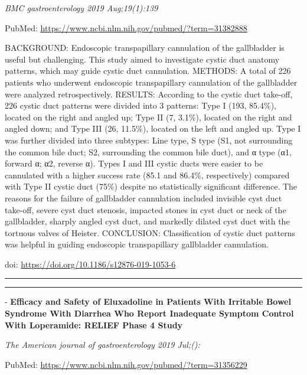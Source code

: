 \documentclass[]{article}
\begin{document}
\emph{BMC gastroenterology 2019 Aug;19(1):139}

PubMed: \url{https://www.ncbi.nlm.nih.gov/pubmed/?term=31382888}

BACKGROUND: Endoscopic transpapillary cannulation of the gallbladder is
useful but challenging. This study aimed to investigate cystic duct
anatomy patterns, which may guide cystic duct cannulation. METHODS: A
total of 226 patients who underwent endoscopic transpapillary
cannulation of the gallbladder were analyzed retrospectively. RESULTS:
According to the cystic duct take-off, 226 cystic duct patterns were
divided into 3 patterns: Type I (193, 85.4\%), located on the right and
angled up; Type II (7, 3.1\%), located on the right and angled down; and
Type III (26, 11.5\%), located on the left and angled up. Type I was
further divided into three subtypes: Line type, S type (S1, not
surrounding the common bile duct; S2, surrounding the common bile duct),
and α type (α1, forward α; α2, reverse α). Types I and III cystic ducts
were easier to be cannulated with a higher success rate (85.1 and
86.4\%, respectively) compared with Type II cystic duct (75\%) despite
no statistically significant difference. The reasons for the failure of
gallbladder cannulation included invisible cyst duct take-off, severe
cyst duct stenosis, impacted stones in cyst duct or neck of the
gallbladder, sharply angled cyst duct, and markedly dilated cyst duct
with the tortuous valves of Heister. CONCLUSION: Classification of
cystic duct patterns was helpful in guiding endoscopic transpapillary
gallbladder cannulation.

doi: \url{https://doi.org/10.1186/s12876-019-1053-6}

{}

{}

\begin{center}\rule{0.5\linewidth}{\linethickness}\end{center}

\begin{center}\rule{0.5\linewidth}{\linethickness}\end{center}

 - \textbf{Efficacy and Safety of Eluxadoline in Patients With Irritable
Bowel Syndrome With Diarrhea Who Report Inadequate Symptom Control With
Loperamide: RELIEF Phase 4 Study}

\emph{The American journal of gastroenterology 2019 Jul;():}

PubMed: \url{https://www.ncbi.nlm.nih.gov/pubmed/?term=31356229}
\end{document}
